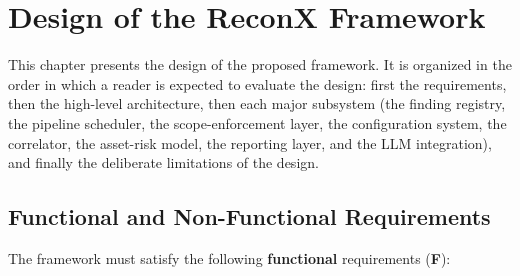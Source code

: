 \chapter{Design of the ReconX Framework}
\label{chap:02}
\setlength{\parskip}{1em}

This chapter presents the design of the proposed framework. It is organized in the order in which a reader is expected to evaluate the design: first the requirements, then the high-level architecture, then each major subsystem (the finding registry, the pipeline scheduler, the scope-enforcement layer, the configuration system, the correlator, the asset-risk model, the reporting layer, and the LLM integration), and finally the deliberate limitations of the design.

\section{Functional and Non-Functional Requirements}

The framework must satisfy the following \textbf{functional} requirements (\textbf{F}):

